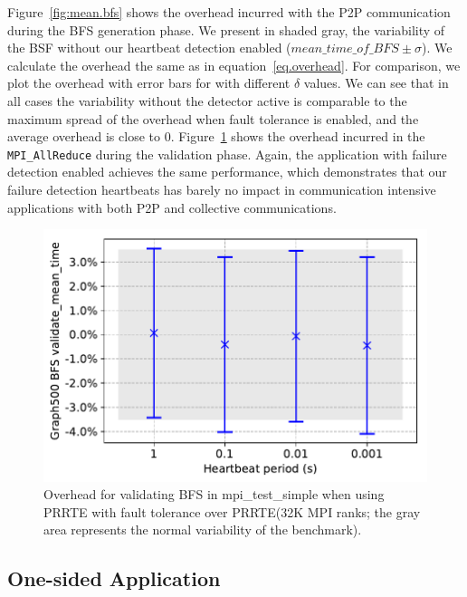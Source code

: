 \documentclass[5p,times,twocolumn]{elsarticle}
\newcommand{\mpifunc}[1]{\lstinline"MPI_#1"\xspace}
\newcommand{\prrte}[0]{\textsc{PRRTE}\xspace}
\newcommand{\mpi}[0]{\textsc{MPI}\xspace}
\begin{document}
Figure~\ref{fig:mean.bfs} shows the overhead incurred with the P2P communication during the BFS generation phase.
We present in shaded gray, the variability of the BSF without our heartbeat detection enabled ($mean\_time\_of\_BFS \pm \sigma$).
We calculate the overhead the same as in equation~\eqref{eq.overhead}. For comparison, we plot the overhead with error bars for with different $\delta$ values.
We can see that in all cases the variability without the detector active is comparable to the maximum spread of the overhead when fault tolerance is enabled, and the average overhead is close to 0.
Figure~\ref{fig:validate.bfs} shows the overhead incurred in the \mpifunc{AllReduce} during the validation phase.
Again, the application with failure detection enabled achieves the same performance, which demonstrates that our failure detection heartbeats has barely no impact in communication intensive applications with both P2P and collective communications.

\begin{figure}[h]
  \centering
  \includegraphics[width=\linewidth]{validate_bfs.pdf}
  \caption{Overhead for validating BFS in mpi\_test\_simple when using \prrte with fault tolerance over \prrte (32K \mpi ranks; the gray area represents the normal variability of the benchmark).}
  \label{fig:validate.bfs}
\end{figure}


\subsection{One-sided Application}
\end{document}
